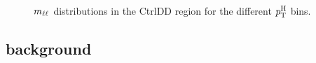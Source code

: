 \begin{figure}[htb]
\caption{$m_{\ell\ell}$ distributions in the CtrlDD region for the different $p_\mathrm{T}^\mathrm{H}$ bins.\label{fig:mllCtrlDD}}
\end{figure}


























\subsection{\WW background \label{sec:WWBackground}}

